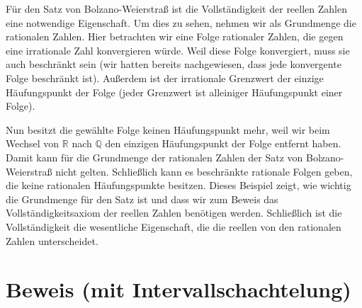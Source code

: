 \documentclass[fontsize=9pt,
               parskip=half-,
               DIV=14,
               listof=chapterentry,
               tocflat]{scrbook}
\begin{document}
Für den Satz von Bolzano-Weierstraß ist die Vollständigkeit der reellen Zahlen eine notwendige Eigenschaft. Um dies zu sehen, nehmen wir als Grundmenge die rationalen Zahlen. Hier betrachten wir eine Folge rationaler Zahlen, die gegen eine irrationale Zahl konvergieren würde. Weil diese Folge konvergiert, muss sie auch beschränkt sein (wir hatten bereits nachgewiesen, dass jede konvergente Folge beschränkt ist). Außerdem ist der irrationale Grenzwert der einzige Häufungspunkt der Folge (jeder Grenzwert ist alleiniger Häufungspunkt einer Folge).

Nun besitzt die gewählte Folge keinen Häufungspunkt mehr, weil wir beim Wechsel von $\mathbb {R} $ nach $\mathbb {Q} $ den einzigen Häufungspunkt der Folge entfernt haben. Damit kann für die Grundmenge der rationalen Zahlen der Satz von Bolzano-Weierstraß nicht gelten. Schließlich kann es beschränkte rationale Folgen geben, die keine rationalen Häufungspunkte besitzen. Dieses Beispiel zeigt, wie wichtig die Grundmenge für den Satz ist und dass wir zum Beweis das Vollständigkeitsaxiom der reellen Zahlen benötigen werden. Schließlich ist die Vollständigkeit die wesentliche Eigenschaft, die die reellen von den rationalen Zahlen unterscheidet.

\section{Beweis (mit Intervallschachtelung)}
\end{document}
